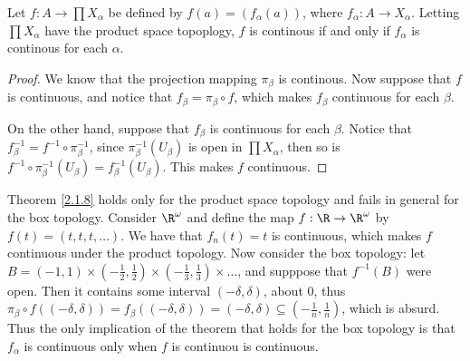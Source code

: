 \begin{theorem}\label{2.1.8}
    Let $f:A \rightarrow \prod{X_{\alpha}}$ be defined by $f(a)=(f_{\alpha}(a))$, where
    $f_{\alpha}:A \rightarrow X_{\alpha}$. Letting $\prod{X_{\alpha}}$ have the product space
    topoplogy, $f$ is continous if and only if  $f_{\alpha}$ is continous for each $\alpha$.
\end{theorem}
\begin{proof}
    We know that the projection mapping $\pi_{\beta}$ is continous. Now suppose that $f$ is
    continuous, and notice that  $f_{\beta}=\pi_{\beta} \circ f$, which makes $f_{\beta}$ continuous
    for each $\beta$.

    On the other hand, suppose that  $f_{\beta}$ is continuous for each $\beta$. Notice that
    $f_{\beta}^{-1}=f^{-1} \circ \pi_{\beta}^{-1}$, since $\pi_{\beta}^{-1}(U_{\beta})$ is open in
    $\prod{X_{\alpha}}$, then so is $f^{-1} \circ
    \pi_{\beta}^{-1}(U_{\beta})=f_{\beta}^{-1}(U_\beta)$. This makes $f$ continuous.
\end{proof}

\begin{example}
    Theorem \ref{2.1.8} holds only for the product space topology and fails in general for the box
    topology. Consider $\R^{\omega}$ and define the map $f:\R \rightarrow \R^{\omega}$ by
    $f(t)=(t,t,t, \dots)$. We have that $f_n(t)=t$ is continuous, which makes $f$ continuous under
    the product topology. Now consider the box topology: let  $B=(-1,1) \times
    (-\frac{1}{2},\frac{1}{2}) \times (-\frac{1}{3}, \frac{1}{3}) \times \dots$, and supppose that
    $f^{-1}(B)$ were open. Then it contains some interval $(-\delta,\delta)$, about $0$, thus
    $\pi_{\beta} \circ f((-\delta,\delta))=f_{\beta}((-\delta,\delta))=(-\delta,\delta) \subseteq
    (-\frac{1}{n}, \frac{1}{n})$, which is absurd. Thus the only implication of the theorem that
    holds for the box topology is that $f_{\alpha}$ is continuous only when $f$ is continuou is
    continuous.
\end{example}
